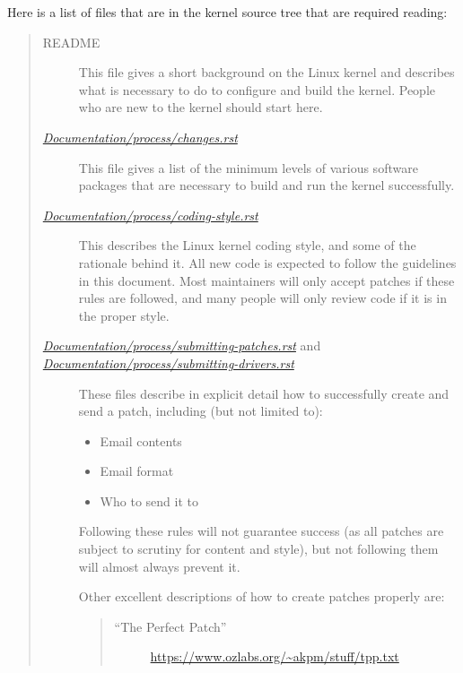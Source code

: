 \documentclass[a4paper,8pt,english]{sphinxmanual}
\begin{document}
Here is a list of files that are in the kernel source tree that are
required reading:
\begin{quote}
\begin{description}
\item[{README}] \leavevmode
This file gives a short background on the Linux kernel and describes
what is necessary to do to configure and build the kernel.  People
who are new to the kernel should start here.

\item[{{\hyperref[process/changes:changes]{\emph{Documentation/process/changes.rst}}}}] \leavevmode
This file gives a list of the minimum levels of various software
packages that are necessary to build and run the kernel
successfully.

\item[{{\hyperref[process/coding\string-style:codingstyle]{\emph{Documentation/process/coding-style.rst}}}}] \leavevmode
This describes the Linux kernel coding style, and some of the
rationale behind it. All new code is expected to follow the
guidelines in this document. Most maintainers will only accept
patches if these rules are followed, and many people will only
review code if it is in the proper style.

\item[{{\hyperref[process/submitting\string-patches:submittingpatches]{\emph{Documentation/process/submitting-patches.rst}}} and {\hyperref[process/submitting\string-drivers:submittingdrivers]{\emph{Documentation/process/submitting-drivers.rst}}}}] \leavevmode
These files describe in explicit detail how to successfully create
and send a patch, including (but not limited to):
\begin{itemize}
\item {} 
Email contents

\item {} 
Email format

\item {} 
Who to send it to

\end{itemize}

Following these rules will not guarantee success (as all patches are
subject to scrutiny for content and style), but not following them
will almost always prevent it.

Other excellent descriptions of how to create patches properly are:
\begin{quote}
\begin{description}
\item[{``The Perfect Patch''}] \leavevmode
\href{https://www.ozlabs.org/~akpm/stuff/tpp.txt}{https://www.ozlabs.org/\textasciitilde{}akpm/stuff/tpp.txt}


\end{description}
\end{quote}
\end{description}
\end{quote}
\end{document}
